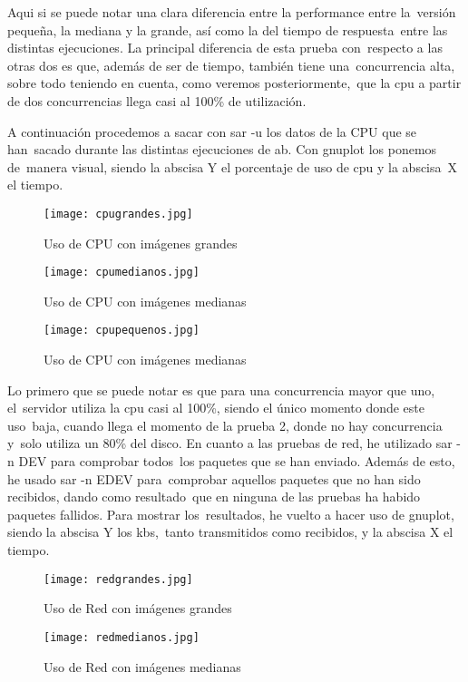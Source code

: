 \documentclass[11pt,twoside,a4paper]{book}
\begin{document}
Aqui si se puede notar una clara diferencia entre la performance entre la\
versión pequeña, la mediana y la grande, así como la del tiempo de respuesta\
entre las distintas ejecuciones. La principal diferencia de esta prueba con\
respecto a las otras dos es que, además de ser de tiempo, también tiene una\
concurrencia alta, sobre todo teniendo en cuenta, como veremos posteriormente,\
que la cpu a partir de dos concurrencias llega casi al 100\% de utilización.

A continuación procedemos a sacar con sar -u los datos de la CPU que se han\
sacado durante las distintas ejecuciones de ab. Con gnuplot los ponemos de\
manera visual, siendo la abscisa Y el porcentaje de uso de cpu y la abscisa\
X el tiempo.

\begin{figure}[H]
   \texttt{[image: cpugrandes.jpg]}
   \caption{Uso de CPU con imágenes grandes}
   \label{cpu1}
\end{figure}

\begin{figure}[H]
   \texttt{[image: cpumedianos.jpg]}
   \caption{Uso de CPU con imágenes medianas}
   \label{cpu2}
\end{figure}

\begin{figure}[H]
   \texttt{[image: cpupequenos.jpg]}
   \caption{Uso de CPU con imágenes medianas}
   \label{cpu3}
\end{figure}
Lo primero que se puede notar es que para una concurrencia mayor que uno, el\
servidor utiliza la cpu casi al 100\%, siendo el único momento donde este uso\
baja, cuando llega el momento de la prueba 2, donde no hay concurrencia y\
solo utiliza un 80\% del disco. \newline
En cuanto a las pruebas de red, he utilizado sar -n DEV para comprobar todos\
los paquetes que se han enviado. Además de esto, he usado sar -n EDEV para\
comprobar aquellos paquetes que no han sido recibidos, dando como resultado\
que en ninguna de las pruebas ha habido paquetes fallidos. Para mostrar los\
resultados, he vuelto a hacer uso de gnuplot, siendo la abscisa Y los kbs,\
tanto transmitidos como recibidos, y la abscisa X el tiempo.
\begin{figure}[H]
   \texttt{[image: redgrandes.jpg]}
   \caption{Uso de Red con imágenes grandes}
   \label{red1}
\end{figure}

\begin{figure}[H]
   \texttt{[image: redmedianos.jpg]}
   \caption{Uso de Red con imágenes medianas}
   \label{red2}
\end{figure}
\end{document}
